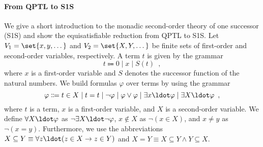 \documentclass{LMCS}
\theoremstyle{plain}\newtheorem{theorem}[thm]{Theorem}
\theoremstyle{plain}\newtheorem{lemma}[thm]{Lemma}
\theoremstyle{plain}\newtheorem{proposition}[thm]{Proposition}
\theoremstyle{plain}\newtheorem{corollary}[thm]{Corollary}
\theoremstyle{definition}\newtheorem{definition}{Definition}[section]
\begin{document}
\paragraph{\bf From QPTL to S1S}
We give a short introduction to the monadic second-order theory of one successor (S1S) and show the equisatisfiable reduction from QPTL to S1S.
Let $V_1 = \set{x,y,\dots}$ and $V_2 = \set{X,Y,\dots}$ be finite sets of first-order and second-order variables, respectively.
A term $t$ is given by the grammar
\begin{equation*} \label{eq:s1s_terms}
  t \Coloneqq 0 \mid x \mid S(t) \enspace,
\end{equation*}
where $x$ is a first-order variable and $S$ denotes the successor function of the natural numbers.
We build formulas $\varphi$ over terms by using the grammar
\begin{equation*} \label{eq:s1s_formulas}
  \varphi \Coloneqq t \in X \mid t = t \mid \neg\varphi \mid \varphi \lor \varphi \mid \exists x\ldot \varphi \mid \exists X \ldot \varphi \enspace,
\end{equation*}
where $t$ is a term, $x$ is a first-order variable, and $X$ is a second-order variable.
We define $\forall X \ldot \varphi$ as $\neg \exists X \ldot \neg\varphi$, $x \notin X$ as $\neg (x \in X)$, and $x \neq y$ as $\neg (x = y)$.
Furthermore, we use the abbreviations $X \subseteq Y \equiv \forall z \ldot (z \in X \rightarrow z \in Y)$ and $X = Y \equiv X \subseteq Y \land Y \subseteq X$.
\end{document}
